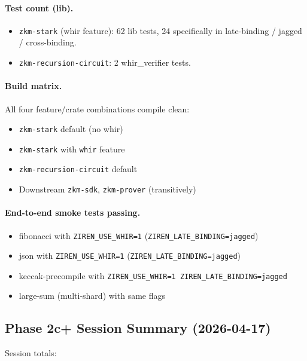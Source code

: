 \paragraph{Test count (lib).}
\begin{itemize}
  \item \texttt{zkm-stark} (whir feature): 62 lib tests, 24
        specifically in late-binding / jagged / cross-binding.
  \item \texttt{zkm-recursion-circuit}: 2 whir\_verifier tests.
\end{itemize}

\paragraph{Build matrix.}
All four feature/crate combinations compile clean:
\begin{itemize}
  \item \texttt{zkm-stark} default (no whir)
  \item \texttt{zkm-stark} with \texttt{whir} feature
  \item \texttt{zkm-recursion-circuit} default
  \item Downstream \texttt{zkm-sdk}, \texttt{zkm-prover} (transitively)
\end{itemize}

\paragraph{End-to-end smoke tests passing.}
\begin{itemize}
  \item fibonacci with \texttt{ZIREN\_USE\_WHIR=1}
        (\texttt{ZIREN\_LATE\_BINDING=jagged})
  \item json with \texttt{ZIREN\_USE\_WHIR=1}
        (\texttt{ZIREN\_LATE\_BINDING=jagged})
  \item keccak-precompile with
        \texttt{ZIREN\_USE\_WHIR=1 ZIREN\_LATE\_BINDING=jagged}
  \item large-sum (multi-shard) with same flags
\end{itemize}

\subsection{Phase 2c+ Session Summary (2026-04-17)}

Session totals:

